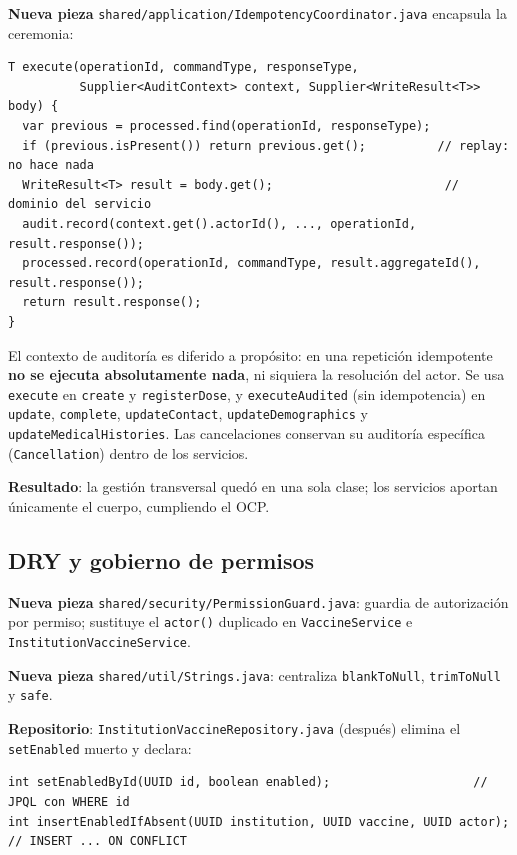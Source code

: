 \documentclass[11pt,a4paper]{article}
\begin{document}
\textbf{Nueva pieza} \texttt{shared/application/IdempotencyCoordinator.java}
encapsula la ceremonia:

\begin{lstlisting}
T execute(operationId, commandType, responseType,
          Supplier<AuditContext> context, Supplier<WriteResult<T>> body) {
  var previous = processed.find(operationId, responseType);
  if (previous.isPresent()) return previous.get();          // replay: no hace nada
  WriteResult<T> result = body.get();                        // dominio del servicio
  audit.record(context.get().actorId(), ..., operationId, result.response());
  processed.record(operationId, commandType, result.aggregateId(), result.response());
  return result.response();
}
\end{lstlisting}

El contexto de auditoría es diferido a propósito: en una repetición idempotente
\textbf{no se ejecuta absolutamente nada}, ni siquiera la resolución del actor.
Se usa \texttt{execute} en \texttt{create} y \texttt{registerDose}, y
\texttt{executeAudited} (sin idempotencia) en \texttt{update},
\texttt{complete}, \texttt{updateContact}, \texttt{updateDemographics} y
\texttt{updateMedicalHistories}. Las cancelaciones conservan su auditoría
específica (\texttt{Cancellation}) dentro de los servicios.

\textbf{Resultado}: la gestión transversal quedó en una sola clase; los
servicios aportan únicamente el cuerpo, cumpliendo el OCP.

\subsection{DRY y gobierno de permisos}

\textbf{Nueva pieza} \texttt{shared/security/PermissionGuard.java}: guardia de
autorización por permiso; sustituye el \texttt{actor()} duplicado en
\texttt{VaccineService} e \texttt{InstitutionVaccineService}.

\textbf{Nueva pieza} \texttt{shared/util/Strings.java}: centraliza
\texttt{blankToNull}, \texttt{trimToNull} y \texttt{safe}.

\textbf{Repositorio}: \texttt{InstitutionVaccineRepository.java} (después)
elimina el \texttt{setEnabled} muerto y declara:

\begin{lstlisting}
int setEnabledById(UUID id, boolean enabled);                    // JPQL con WHERE id
int insertEnabledIfAbsent(UUID institution, UUID vaccine, UUID actor); // INSERT ... ON CONFLICT
\end{lstlisting}
\end{document}

